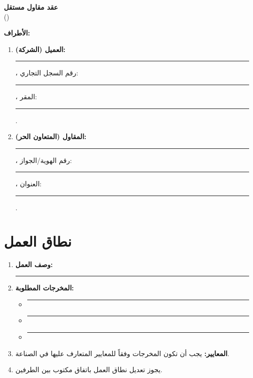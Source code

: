 \documentclass[12pt,a4paper]{article}
\begin{document}
\begin{center}
{\LARGE\bfseries عقد مقاول مستقل}\\[0.5em]
{\large ()}\\[1em]
\end{center}

\vspace{1em}

\noindent\textbf{الأطراف:}

\begin{enumerate}
    \item \textbf{العميل (الشركة):} \rule{8cm}{0.4pt}، رقم السجل التجاري: \rule{4cm}{0.4pt}، المقر: \rule{6cm}{0.4pt}.

    \item \textbf{المقاول (المتعاون الحر):} \rule{8cm}{0.4pt}، رقم الهوية/الجواز: \rule{4cm}{0.4pt}، العنوان: \rule{6cm}{0.4pt}.
\end{enumerate}

\vspace{1em}

\section{نطاق العمل}
\label{sec:scope}
\begin{enumerate}
    \item \textbf{وصف العمل:} \rule{10cm}{0.4pt}
    \item \textbf{المخرجات المطلوبة:}
    \begin{itemize}
        \item \rule{10cm}{0.4pt}
        \item \rule{10cm}{0.4pt}
        \item \rule{10cm}{0.4pt}
    \end{itemize}
    \item \textbf{المعايير:} يجب أن تكون المخرجات وفقاً للمعايير المتعارف عليها في الصناعة.
    \item يجوز تعديل نطاق العمل باتفاق مكتوب بين الطرفين.
\end{enumerate}

\end{document}
